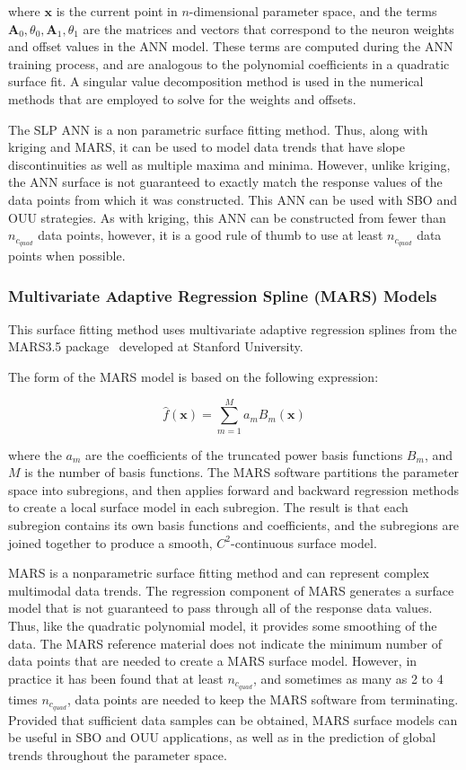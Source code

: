 where $\mathbf{x}$ is the current point in $n$-dimensional parameter
space, and the terms
$\mathbf{A}_{0},\theta_{0},\mathbf{A}_{1},\theta_{1}$ are the matrices
and vectors that correspond to the neuron weights and offset values in
the ANN model. These terms are computed during the ANN training
process, and are analogous to the polynomial coefficients in a
quadratic surface fit. A singular value decomposition method is used
in the numerical methods that are employed to solve for the weights
and offsets.

The SLP ANN is a non parametric surface fitting method. Thus, along
with kriging and MARS, it can be used to model data trends that have
slope discontinuities as well as multiple maxima and minima. However,
unlike kriging, the ANN surface is not guaranteed to exactly match the
response values of the data points from which it was constructed. This
ANN can be used with SBO and OUU strategies. As with kriging, this ANN
can be constructed from fewer than $n_{c_{quad}}$ data points,
however, it is a good rule of thumb to use at least $n_{c_{quad}}$
data points when possible.

\subsubsection{Multivariate Adaptive Regression Spline (MARS) Models}\label{models:surf:mars}

This surface fitting method uses multivariate adaptive regression
splines from the MARS3.5 package~\cite{Fri91} developed at Stanford
University. 

The form of the MARS model is based on the following expression:

\begin{equation}
  \hat{f}(\mathbf{x})=\sum_{m=1}^{M}a_{m}B_{m}(\mathbf{x})
  \label{models:surf:equation10}  
\end{equation}

where the $a_{m}$ are the coefficients of the truncated power basis
functions $B_{m}$, and $M$ is the number of basis functions. The MARS
software partitions the parameter space into subregions, and then
applies forward and backward regression methods to create a local
surface model in each subregion. The result is that each subregion
contains its own basis functions and coefficients, and the subregions
are joined together to produce a smooth, $C^{2}$-continuous surface
model.

MARS is a nonparametric surface fitting method and can represent
complex multimodal data trends. The regression component of MARS
generates a surface model that is not guaranteed to pass through all
of the response data values. Thus, like the quadratic polynomial
model, it provides some smoothing of the data. The MARS reference
material does not indicate the minimum number of data points that are
needed to create a MARS surface model. However, in practice it has
been found that at least $n_{c_{quad}}$, and sometimes as many as 2 to
4 times $n_{c_{quad}}$, data points are needed to keep the MARS
software from terminating.  Provided that sufficient data samples can
be obtained, MARS surface models can be useful in SBO and OUU
applications, as well as in the prediction of global trends throughout
the parameter space.

